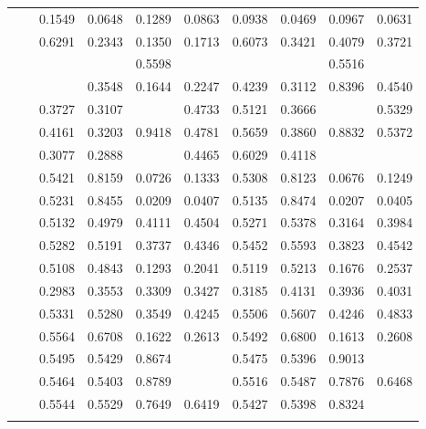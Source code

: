 {\begin{table}[t]
{\begin{tabular}{|l|l|r|r|r|r|r|r|r|r|}
				&\PN        & 0.1549 & 0.0648 & 0.1289 & 0.0863 & 0.0938 & 0.0469 & 0.0967 & 0.0631 \\\cline{2-10}
				&\Supervise & 0.6291 & 0.2343 & 0.1350 & 0.1713 & 0.6073 & 0.3421 & 0.4079 & 0.3721 \\
				&\ICSGNN    & \cellcolor{LightRed}{0.7606} & \cellcolor{LightCyan}{0.5722} & 0.5598 & \cellcolor{LightRed}{0.5659} & \cellcolor{LightCyan}{0.7574} & \cellcolor{LightCyan}{0.5906} & 0.5516 & \cellcolor{LightRed}{0.5704} \\
				&\AQDGNN    & \cellcolor{LightCyan}{0.6779} & 0.3548 & 0.1644 & 0.2247 & 0.4239 & 0.3112 & 0.8396 & 0.4540\\\cline{2-10}
				&\CGNPIP    & 0.3727 & 0.3107 & \cellcolor{LightRed}{0.9925} & {0.4733} & 0.5121 & 0.3666 & \cellcolor{LightRed}{0.9756} & {0.5329} \\
				&\CGNPMLP   & 0.4161 & 0.3203 & 0.9418 &\cellcolor{LightCyan} {0.4781} & 0.5659 & 0.3860 & 0.8832 &{0.5372} \\
				&\CGNPGNN   & 0.3077 & 0.2888 & \cellcolor{LightCyan}{0.9835} & 0.4465 & 0.6029	&0.4118	&\cellcolor{LightCyan}{0.9145}	&\cellcolor{LightCyan}{0.5678}\\\hline\hline
				
				\comment{
				\multirow{11}{*}{\rotatebox{90}{\Coraciteseer}} 
				&\ATC       & 0.5421 & 0.8159 & 0.0726 & 0.1333 & 0.5308 & 0.8123 & 0.0676 & 0.1249 \\
				&\CTC       & 0.5231 & 0.8455 & 0.0209 & 0.0407 & 0.5135 & 0.8474 & 0.0207 & 0.0405 \\\cline{2-10}
				&\MAML      & 0.5132 & 0.4979 & 0.4111 & 0.4504 & 0.5271 & 0.5378 & 0.3164 & 0.3984 \\
				&\Reptile   & 0.5282 & 0.5191 & 0.3737 & 0.4346 & 0.5452 & 0.5593 & 0.3823 & 0.4542 \\
				&\Featrans  & 0.5108 & 0.4843 & 0.1293 & 0.2041 & 0.5119 & 0.5213 & 0.1676 & 0.2537 \\
				&\PN        & 0.2983 & 0.3553 & 0.3309 & 0.3427 & 0.3185 & 0.4131 & 0.3936 & 0.4031 \\\cline{2-10}
				&\Supervise & 0.5331 & 0.5280 & 0.3549 & 0.4245 & 0.5506 & 0.5607 & 0.4246 & 0.4833 \\
				&\ICSGNN    & 0.5564 & 0.6708 & 0.1622 & 0.2613 & 0.5492 & 0.6800 & 0.1613 & 0.2608 \\\cline{2-10}
				&\CGNPIP    & 0.5495 & 0.5429 & 0.8674 & \cellcolor{LightCyan}{0.6678} & 0.5475 & 0.5396 & 0.9013 & \cellcolor{LightRed}{0.6750} \\
				&\CGNPMLP   & 0.5464 & 0.5403 & 0.8789 & \cellcolor{LightRed}{0.6692} & 0.5516 & 0.5487 & 0.7876 & 0.6468 \\
				&\CGNPGNN   & 0.5544 & 0.5529 & 0.7649 & 0.6419 & 0.5427 & 0.5398 & 0.8324 & \cellcolor{LightCyan}{0.6549}   \\\hline\hline
				}
		

\end{tabular}}
\end{table}}
